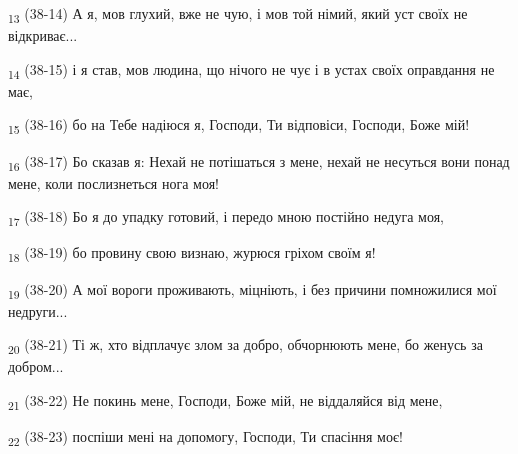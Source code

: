 \begin{tcolorbox}
\textsubscript{13} (38-14) А я, мов глухий, вже не чую, і мов той німий, який уст своїх не відкриває...
\end{tcolorbox}
\begin{tcolorbox}
\textsubscript{14} (38-15) і я став, мов людина, що нічого не чує і в устах своїх оправдання не має,
\end{tcolorbox}
\begin{tcolorbox}
\textsubscript{15} (38-16) бо на Тебе надіюся я, Господи, Ти відповіси, Господи, Боже мій!
\end{tcolorbox}
\begin{tcolorbox}
\textsubscript{16} (38-17) Бо сказав я: Нехай не потішаться з мене, нехай не несуться вони понад мене, коли послизнеться нога моя!
\end{tcolorbox}
\begin{tcolorbox}
\textsubscript{17} (38-18) Бо я до упадку готовий, і передо мною постійно недуга моя,
\end{tcolorbox}
\begin{tcolorbox}
\textsubscript{18} (38-19) бо провину свою визнаю, журюся гріхом своїм я!
\end{tcolorbox}
\begin{tcolorbox}
\textsubscript{19} (38-20) А мої вороги проживають, міцніють, і без причини помножилися мої недруги...
\end{tcolorbox}
\begin{tcolorbox}
\textsubscript{20} (38-21) Ті ж, хто відплачує злом за добро, обчорнюють мене, бо женусь за добром...
\end{tcolorbox}
\begin{tcolorbox}
\textsubscript{21} (38-22) Не покинь мене, Господи, Боже мій, не віддаляйся від мене,
\end{tcolorbox}
\begin{tcolorbox}
\textsubscript{22} (38-23) поспіши мені на допомогу, Господи, Ти спасіння моє!
\end{tcolorbox}
